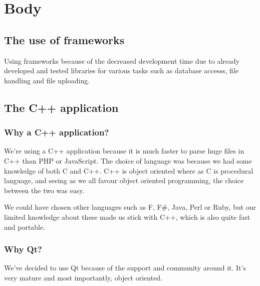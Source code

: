 \chapter{Body}
\section{The use of frameworks}
Using frameworks because of the decreased development time due to already developed and tested libraries for various tasks such as database accesss, file handling and file uploading.

\section{The C++ application}
\subsection{Why a C++ application?}
We're using a C++ application because it is much faster to parse huge files in C++ than PHP or JavaScript.
The choice of language was because we had some knowledge of both C and C++. C++ is object oriented where as C is procedural language, and seeing as we all favour object oriented programming, the choice between the two was easy.

We could have chosen other languages such as F, F\#, Java, Perl or Ruby, but our limited knowledge about these made us stick with C++, which is also quite fast and portable.

\subsection{Why Qt?}
We've decided to use Qt because of the support and community around it. It's very mature and most importantly, object oriented.

